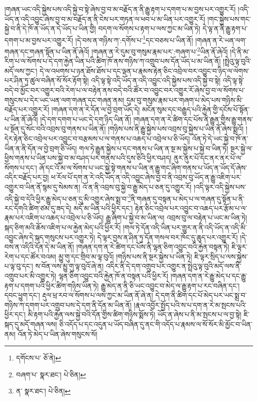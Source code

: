 །གཞན་ཡང་འདི་སྐྱེས་པས་འདི་སྐྱེ་བ་སྟེ་ཞེས་བྱ་བ་མ་བརྗོད་ན་ནི་རྒྱུ་རྟག་པ་དགག་པ་མ་བྱས་པར་འགྱུར་རོ། །འདི་ཡོད་ན་འདི་འབྱུང་ཞེས་བྱ་བ་མ་བརྗོད་ན་ནི་ངེས་པར་གཏན་ལ་ཕབ་པ་མ་ཡིན་པར་འགྱུར་རོ། །གང་སྐྱེས་པས་གང་སྐྱེ་བ་ནི་དེ་ཁོ་ན་ཡོད་ན་དེ་ཡོད་པ་ཡིན་གྱི། བདག་ལ་སོགས་པ་རྟག་པ་ལས་ཀྱང་མ་ཡིན་ཏེ། དེ་ལྟ་ན་ནི་རྒྱུ་རྟག་པ་དགག་པ་མ་བྱས་པར་འགྱུར་རོ། །དེ་བས་ན་གཉིས་ཀ་:དགོས་པ་\footnote{དགོངས་པ་  ཅོ་ནེ། }དང་བཅས་པ་ཡིན་ནོ། །གཞན་ན་རེ་ཡན་ལག་གཞན་དང་གཞན་སྟོན་པ་ཡིན་ནོ་ཞེའོ། །གཞན་ན་རེ་དུམ་བུ་གསུམ་རྣམ་པར་:གཞག་པ་\footnote{བཞག་པ་  སྣར་ཐང་།  པེ་ཅིན། }ཡིན་ནོ་ཞེའོ། །དེ་ནི་མ་རིག་པ་ལ་སོགས་པ་དེ་དག་རྐྱེན་ཡིན་པའི་ཚིག་ཁོ་ནས་གཉིས་ཀ་འགྲུབ་པས་དོན་ཡོད་པ་མ་ཡིན་ནོ། །སྤྲེའུ་ལྟ་བུའི་མདོ་ལས་ཀྱང་། དེ་ལ་འཕགས་པ་ཉན་ཐོས་ཐོས་པ་དང་ལྡན་པ་རྣམས་རྟེན་ཅིང་འབྲེལ་བར་འབྱུང་བ་ཉིད་ལ་ལེགས་པར་ཤིན་ཏུ་ཚུལ་བཞིན་སོ་སོར་རྟོག་སྟེ། འདི་ལྟ་སྟེ་འདི་ཡོད་ན་འདི་འབྱུང་འདི་སྐྱེས་པས་འདི་སྐྱེ་བ་སྟེ། འདི་ལྟ་སྟེ་བདེ་བ་མྱོང་བར་འགྱུར་བའི་རེག་པ་ལ་བརྟེན་ནས་བདེ་བའི་ཚོར་བ་འབྱུང་བར་འགྱུར་རོ་ཞེས་བྱ་བ་ལ་སོགས་པ་གསུངས་པ་དེར་ཡང་ཡན་ལག་གཞན་དང་གཞན་ནམ། དུམ་བུ་གསུམ་རྣམ་པར་གཞག་པ་མེད་པས་གཉིས་མི་བརྗོད་པར་འགྱུར་རོ། །གཞན་དག་ན་རེ་དོན་ལ་བྱེ་བྲག་ཡོད་དེ། མངོན་སུམ་དང་བརྒྱུད་པའི་རྐྱེན་གྱི་དངོས་པོ་སྟོན་པ་ཡིན་ནོ་ཞེའོ། །དེ་དག་དགག་པ་ཡང་དེ་དག་ཉིད་ཡིན་ནོ། །གཞན་དག་ན་རེ་ཚིག་དང་པོས་ནི་རྒྱུན་གྱིས་རྒྱུ་གནས་པ་སྔོན་དུ་སོང་བའི་འབྲས་བུ་གནས་པ་ཡིན་ནོ། །གཉིས་པས་ནི་རྒྱུ་སྐྱེས་པས་འབྲས་བུ་སྐྱེས་པ་ཡིན་ནོ་ཞེས་སྨྲའོ། །དེར་རྟེན་ཅིང་འབྲེལ་པར་འབྱུང་བ་བརྩམས་པ་ལ་གནས་པ་འཆད་པ་འབྲེལ་པ་ཅི་ཡོད། འོན་ཏེ་དེ་ཡང་སྐྱེ་བ་ཁོ་ན་ཡིན་ན་ནི་དོན་ལ་བྱེ་བྲག་ཅི་ཡོད། གལ་ཏེ་རྒྱུན་སྐྱེས་པ་དང་གནས་པ་ཡིན་ན་སྔ་མ་སྐྱེས་པ་སྐྱེ་བ་ཡིན་ཏེ། སྔར་སྐྱེ་ལ་ཕྱིས་གནས་པ་ཡིན་པས་སྐྱེ་བ་མ་བཤད་པར་གནས་པའི་དུས་ཅིའི་ཕྱིར་བཤད། ནུར་ནུར་པོ་དང་ནར་ནར་པོ་ལ་སོགས་པ་དང་། ཞོ་དང་འོ་མ་ལ་སོགས་པ་ཡང་སྐྱེ་སྟེ་གནས་པ་ཡིན་ན་རྒྱུ་གང་ཞིག་གནས་པ་ཡོད་ན་ཡོད་དོ་ཞེས་འདིར་བརྗོད་པར་བྱ། ཕ་རོལ་པོ་དག་ན་རེ་འདི་ཡོད་ན་འདི་འབྱུང་ཞེས་བྱ་བ་ནི་འབྲས་བུ་ཡོད་ན་རྒྱུ་འཇིག་པར་འགྱུར་བ་ཡིན་ནོ་སྙམ་དུ་སེམས་ན། འོ་ན་ནི་འབྲས་བུ་སྐྱེ་བ་རྒྱུ་མེད་པ་ཅན་དུ་འགྱུར་རོ། །འདི་ལྟར་འདི་སྐྱེས་པས་འདི་སྐྱེ་བ་དེའི་ཕྱིར་རྒྱུ་མེད་པ་ཅན་དུ་མི་འགྱུར་ཞེས་སྨྲ་བ་\footnote{ན་  སྣར་ཐང་།  པེ་ཅིན། }ནི་གཞན་དུ་བསྟན་པ་མེད་པ་ལ་གཞན་དུ་སྟོན་པ་ནི་རང་དགའི་ཚིག་ཙམ་དུ་ཟད་དེ། མདོ་མ་ཡིན་པའི་ཕྱིར་དང་། རྟེན་ཅིང་འབྲེལ་པར་འབྱུང་བ་འཆད་པར་རྩོམ་པ་ལ་རྣམ་པར་འཇིག་པ་འཆད་པ་འབྲེལ་པ་ཅི་ཡོད། རྒྱུ་ཞིག་པ་སྐྱེ་བ་མ་ཡིན་ལ། འབྲས་བུ་ལ་བརྟེན་པ་ཡང་མ་ཡིན་ཏེ། སྐད་ཅིག་མའི་ཆོས་འཇིག་པ་ལ་རྐྱེན་མེད་པའི་ཕྱིར་རོ། །གལ་ཏེ་དོན་འདི་ཡིན་པར་གྱུར་ན་ནི་འདི་ཡོད་ན་འདི་མི་འབྱུང་ཞེས་དེ་སྐད་གསུངས་པར་འགྱུར་ཏེ། དེ་ལྟར་བྱས་ན་ཤིན་ཏུ་དོན་གསལ་བར་ཁོང་དུ་ཆུད་པར་འགྱུར་རོ། །དེ་བས་ན་འདིའི་དོན་དེ་མ་ཡིན་ནོ། །གཞན་དག་ན་རེ་ཚིག་དང་པོས་ནི་ལྷན་ཅིག་འབྱུང་བའི་རྐྱེན་བསྟན་ཏེ། ཇི་ལྟར་རེག་པ་དང་ཚོར་བའམ། མྱུ་གུ་དང་གྲིབ་མ་ལྟ་བུའོ། །གཉིས་པས་ནི་སྔར་སྐྱེས་པ་ཡིན་ཏེ། ཇི་ལྟར་སྲིད་པ་ལས་སྐྱེས་པ་ལྟ་བུ་དང་། ས་བོན་ལས་མྱུ་གུ་ལྟ་བུའོ་ཞེ་ན། འདིར་ནི་དེ་དག་འགྲུབ་པར་འགྱུར་ན་སྤྲེའུ་ལྟ་བུའི་མདོ་ལས་ནི་འགྲུབ་པར་མི་འགྱུར་ཏེ། ལྷན་ཅིག་འབྱུང་བའི་རྐྱེན་ཁོ་ན་བསྟན་པའི་ཕྱིར་རོ། །གཞན་དག་ན་རེ་རྒྱུ་མེད་པ་དང་རྒྱུ་རྟག་པ་དགག་པའི་ཕྱིར་ཚིག་གཉིས་ཡིན་ཏེ། རྒྱུ་མེད་ན་ནི་ཅི་ཡང་འབྱུང་བ་མེད་ལ་རྒྱུ་རྟག་པ་རང་བཞིན་དང་། དབང་ཕྱུག་དང་། རྡུལ་ཕྲ་རབ་ལ་སོགས་པ་ལས་ཀྱང་མ་ཡིན་ནོ་ཞེ་ན། དེ་དག་ནི་ཚིག་དང་པོ་མེད་པར་ཡང་སྨྲ་བ་གཉིས་ཀ་དགག་པར་འགྲུབ་པས་དེ་དག་ནི་དོན་མ་ཡིན་ནོ། །རྣལ་འབྱོར་སྤྱོད་པའི་ས་པ་དག་ན་རེ་མ་སྤངས་པའི་ཕྱིར་དང་། མི་རྟག་པའི་རྐྱེན་ལས་སྐྱེ་བའི་དོན་གྱིས་ཚིག་གཉིས་སྨོས་ཏེ། ཡོད་ན་ཞེས་པ་ནི་མ་སྤངས་པ་ལ་བྱ་སྟེ། ཇི་སྐད་དུ་མདོ་གཞན་ལས། ཅི་འདོད་པ་དང་འདུན་པ་ཡོད་བཞིན་དུ་ནང་གི་འདོད་པ་རྣམས་ལ་སོ་སོར་མི་མྱོང་བ་ཡིན་ནམ། འོན་ཏེ་མེད་པ་ཡིན་ཞེས་གསུངས་སོ། 